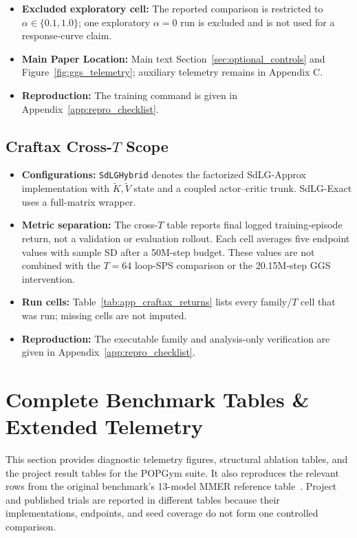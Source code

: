 \begin{itemize}
    \item \textbf{Excluded exploratory cell:} The reported comparison is restricted to $\alpha\in\{0.1,1.0\}$; one exploratory $\alpha=0$ run is excluded and is not used for a response-curve claim.
    \item \textbf{Main Paper Location:} Main text Section~\ref{sec:optional_controls} and Figure~\ref{fig:ggs_telemetry}; auxiliary telemetry remains in Appendix C.
    \item \textbf{Reproduction:} The training command is given in Appendix~\ref{app:repro_checklist}.
\end{itemize}

\subsection{Craftax Cross-$T$ Scope}
\label{app:craftax_cross_t_provenance}
\begin{itemize}
    \item \textbf{Configurations:} \texttt{SdLGHybrid} denotes the factorized SdLG-Approx implementation with $\widetilde K,\widetilde V$ state and a coupled actor--critic trunk. SdLG-Exact uses a full-matrix wrapper.
    \item \textbf{Metric separation:} The cross-$T$ table reports final logged training-episode return, not a validation or evaluation rollout. Each cell averages five endpoint values with sample SD after a 50M-step budget. These values are not combined with the $T=64$ loop-SPS comparison or the 20.15M-step GGS intervention.
    \item \textbf{Run cells:} Table~\ref{tab:app_craftax_returns} lists every family/$T$ cell that was run; missing cells are not imputed.
    \item \textbf{Reproduction:} The executable family and analysis-only verification are given in Appendix~\ref{app:repro_checklist}.
\end{itemize}

\section{Complete Benchmark Tables \& Extended Telemetry}
\label{app:full_results}

This section provides diagnostic telemetry figures, structural ablation tables, and the project result tables for the POPGym suite. It also reproduces the relevant rows from the original benchmark's 13-model MMER reference table~\citep{morad2023popgym}. Project and published trials are reported in different tables because their implementations, endpoints, and seed coverage do not form one controlled comparison.

